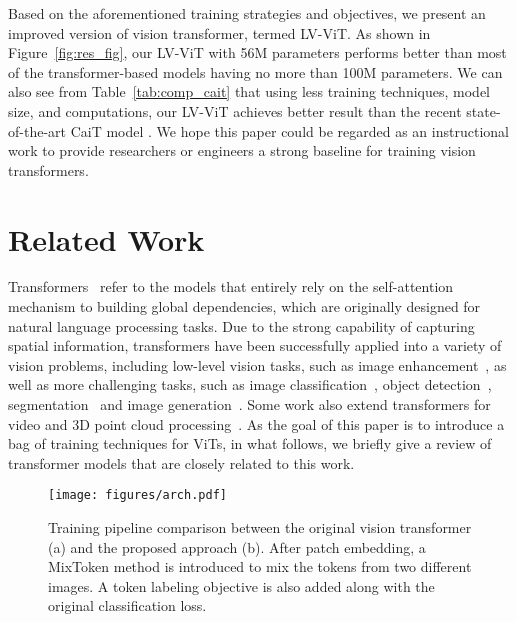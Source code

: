 \documentclass[10pt,twocolumn,letterpaper]{article}
\newcommand{\nameofmethod}{LV-ViT}
\begin{document}
Based on the aforementioned training strategies and objectives, we present an improved version of vision transformer, 
termed \nameofmethod{}.
As shown in Figure~\ref{fig:res_fig}, our \nameofmethod{} with 56M parameters performs better than
most of the transformer-based models having no more than 100M parameters.
We can also see from Table~\ref{tab:comp_cait} that using less training techniques, model size, and computations,
our \nameofmethod{} achieves better result than the recent state-of-the-art CaiT model \cite{touvron2021going}.
We hope this paper could be regarded as an instructional work to provide researchers or engineers
a strong baseline for training vision transformers.

\section{Related Work}

Transformers~\cite{vaswani2017attention} refer to the models that entirely rely on the self-attention mechanism 
to building global dependencies, which are originally designed for natural language processing tasks.
Due to the strong capability of capturing spatial information, transformers have been successfully applied
into a variety of vision problems,  including low-level vision tasks, such as image enhancement~\cite{chen2020pre,yang2020learning}, as well as more challenging tasks,
such as image classification~\cite{chen2020generative, dosovitskiy2020image}, object 
detection~\cite{carion2020end,dai2020up,zhu2020deformable,zheng2020end},
segmentation~\cite{chen2020pre,sun2020rethinking,wang2020end} and image generation~\cite{parmar2018image}. 
Some work also extend transformers for video and 3D point cloud processing~\cite{zeng2020learning,zhao2020point,zhou2018end}.
As the goal of this paper is to introduce a bag of training techniques for ViTs, in what follows, 
we briefly give a review of transformer models that are closely related to this work.

\begin{figure*}[t]
    \centering
    \small
    \texttt{[image: figures/arch.pdf]}
    \caption{Training pipeline comparison between the original vision transformer (a) and the proposed approach (b).
    After patch embedding, a MixToken method is introduced to mix the tokens from two different images. A token labeling
    objective is also added along with the original classification loss.}
    \label{fig:arch}
\end{figure*}
\end{document}
